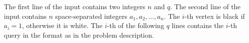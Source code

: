 The first line of the input contains two integers $n$ and $q$.
The second line of the input contains $n$ space-separated integers $a_1,a_2,\ldots,a_n$.
The $i$-th vertex is black if $a_i = 1$, otherwise it is white.
The $i$-th of the following $q$ lines contains the $i$-th query in the format as in the problem description.